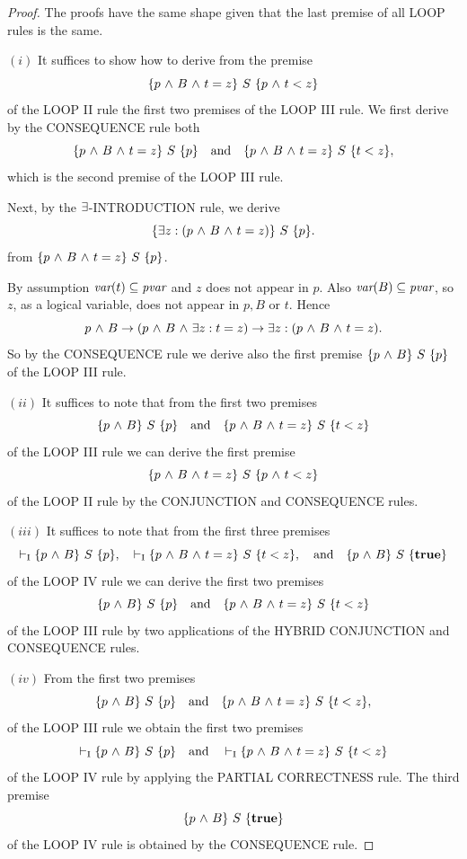 \documentclass[manuscript, screen, review]{acmart}
\begin{document}
\begin{proof}
The proofs have the same shape given that the last premise of all LOOP rules is the same.
  
\NI
$(i)$ It suffices to show how to derive from the premise
\[
  \mbox{$\{{p \mbox{$\ \wedge\ $} B \mbox{$\ \wedge\ $} t=z}\}\ {S}\ \{{p \mbox{$\ \wedge\ $} t<z}\}$}
\]
of the LOOP II rule the first two premises of the LOOP III rule.  We
first derive by the CONSEQUENCE rule both
\[
 \mbox{$\{{p \mbox{$\ \wedge\ $} B \mbox{$\ \wedge\ $} t=z}\}\ {S}\ \{{p}\}$} \quad \mbox{\rm and} \quad
\mbox{$\{{p \mbox{$\ \wedge\ $} B \mbox{$\ \wedge\ $} t=z}\}\ {S}\ \{{t<z}\}$},
\]
which is the second premise of the LOOP III rule.

Next, by the $\mbox{$\exists$}$-INTRODUCTION rule, we derive 
\[
 \mbox{$\{{\mbox{$\exists$} z: (p \mbox{$\ \wedge\ $} B \mbox{$\ \wedge\ $} t=z)}\}\ {S}\ \{{p}\}$}.
\]
from
$\mbox{$\{{p \mbox{$\ \wedge\ $} B \mbox{$\ \wedge\ $} t=z}\}\ {S}\ \{{p}\}$}$.

By assumption $\mbox{\it var}(t)\subseteq \mbox{\it pvar}$ and $z$ does not appear in $p$. Also
$\mbox{\it var}(B)\subseteq \mbox{\it pvar}$, so
$z$, as a logical variable, does not appear
in $p, B$ or $t$. Hence
\[
  p \mbox{$\ \wedge\ $} B \to (p \mbox{$\ \wedge\ $} B \mbox{$\ \wedge\ $} \mbox{$\exists$} z: t=z) \to  \mbox{$\exists$} z: (p \mbox{$\ \wedge\ $} B \mbox{$\ \wedge\ $} t=z).
\]
So by the CONSEQUENCE rule we derive also the first premise
$\mbox{$\{{p \mbox{$\ \wedge\ $} B}\}\ {S}\ \{{p}\}$}$ of the LOOP III rule.
\III

\NI
$(ii)$ It suffices to note that from the first two premises 
\[
  \mbox{$\{{p \mbox{$\ \wedge\ $} B}\}\ {S}\ \{{p}\}$}\quad \mbox{\rm and} \quad
   \mbox{$\{{p \mbox{$\ \wedge\ $} B \mbox{$\ \wedge\ $} t=z}\}\ {S}\ \{{t<z}\}$}
\]
of the LOOP III rule we can derive the first premise
\[
  \mbox{$\{{p \mbox{$\ \wedge\ $} B \mbox{$\ \wedge\ $} t=z}\}\ {S}\ \{{p \mbox{$\ \wedge\ $} t<z}\}$}
\]
of the LOOP II rule by the CONJUNCTION and CONSEQUENCE rules.
\III

\NI
$(iii)$ 
It suffices to note that from the first three premises 
\[
  \vdash_{\rm{I}}  \mbox{$\{{p \mbox{$\ \wedge\ $} B}\}\ {S}\ \{{p}\}$},\quad
  \vdash_{\rm{I}}  \mbox{$\{{p \mbox{$\ \wedge\ $} B \mbox{$\ \wedge\ $} t=z}\}\ {S}\ \{{t<z}\}$},\quad
\mbox{\rm and} \quad
 \mbox{$\{{p \mbox{$\ \wedge\ $} B}\}\ {S}\ \{{\mathbf{true}}\}$}
\]
of the LOOP IV rule
we can derive the first two premises
\[
  \mbox{$\{{p \mbox{$\ \wedge\ $} B}\}\ {S}\ \{{p}\}$} \quad
  \mbox{\rm and} \quad \mbox{$\{{p \mbox{$\ \wedge\ $} B \mbox{$\ \wedge\ $} t=z}\}\ {S}\ \{{t<z}\}$}
\]
of the LOOP III rule by two applications of the HYBRID CONJUNCTION and
CONSEQUENCE rules.
\III

\NI
$(iv)$
From the first two premises
\[
  \mbox{$\{{p \mbox{$\ \wedge\ $} B}\}\ {S}\ \{{p}\}$}
\quad
\mbox{\rm and} \quad
   \mbox{$\{{p \mbox{$\ \wedge\ $} B \mbox{$\ \wedge\ $} t=z}\}\ {S}\ \{{t<z}\}$},
\]
of the LOOP III rule
we obtain the first two premises
$$\vdash_{\rm{I}}  \mbox{$\{{p \mbox{$\ \wedge\ $} B}\}\ {S}\ \{{p}\}$}
\quad
\mbox{\rm and} \quad \vdash_{\rm{I}}  \mbox{$\{{p \mbox{$\ \wedge\ $} B \mbox{$\ \wedge\ $} t=z}\}\ {S}\ \{{t<z}\}$}$$
of the LOOP IV rule
by applying the PARTIAL CORRECTNESS rule.
The third premise
\[
  \mbox{$\{{p \mbox{$\ \wedge\ $} B}\}\ {S}\ \{{\mathbf{true}}\}$}
\]
of the LOOP IV rule is obtained by the CONSEQUENCE rule.
\HB


\end{proof}
\end{document}
